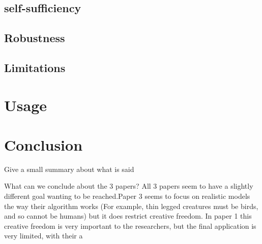 \documentclass{article}
\begin{document}

\subsection{self-sufficiency}


\subsection{Robustness}


\subsection{Limitations}

\section{Usage}





\section{Conclusion}
Give a small summary about what is said

What can we conclude about the 3 papers?  All 3 papers seem to have a slightly
different goal wanting to be reached.Paper 3 seems to focus on realistic models
the way their algorithm works (For example, thin legged creatures must be birds,
and so cannot be humans) but it does restrict creative freedom. In paper 1 this
creative freedom is very important to the researchers, but the final application
is very limited, with their a
\end{document}
